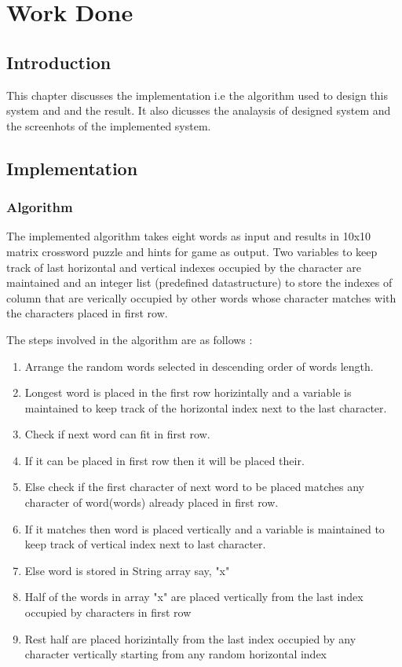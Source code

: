 \chapter{Work Done}


\section{Introduction}
This chapter discusses the implementation i.e the algorithm used to design this system and and the result. It also dicusses the analaysis of designed system and the screenhots of the implemented system. 



\section{Implementation}
\subsection{Algorithm}
\vspace*{2 ex}
The implemented algorithm takes eight words as input and results in 10x10 matrix crossword puzzle and hints for game as output. Two variables to keep track of last horizontal and vertical indexes occupied by the character are maintained and an integer list (predefined datastructure) to store the indexes of column that are verically occupied by other words whose character matches with the characters placed in first row.
\vspace*{2 ex}

The steps involved in the algorithm are as follows : 
\vspace*{2 ex}
\begin{enumerate}
\setlength{\itemsep}{-0.3em}
\item Arrange the random words selected in descending order of words length.
\item Longest word is placed in the first row horizintally and a variable is maintained to keep track of the horizontal index next to the last character. 
\item \quad Check if next word can fit in first row.
\item \quad\quad If it can be placed in first row then it will be placed their.
\item \quad\quad Else check if the first character of next word to be placed matches any character of word(words) already placed in first row.
\item \quad\quad\quad If it matches then word is placed vertically and a variable is maintained to keep track of vertical index next to last character.
\item \quad\quad\quad Else word is stored in String array say, "x"
\item Half of the words in array "x" are placed vertically from the last index occupied by characters in first row
\item Rest half are placed horizintally from the last index occupied by any character vertically starting from any random horizontal index
\end{enumerate} 

